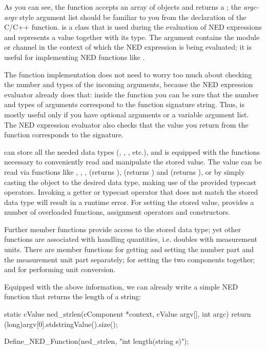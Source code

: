 As you can see, the function accepts an array of 
objects and returns a ; the \textit{argc-argv} style
argument list should be familiar to you from the declaration of the C/C++
 function.  is a class that is used during
the evaluation of NED expressions and represents a value together with its
type.  The  argument contains the module or channel in the
context of which the NED expression is being evaluated; it is useful for
implementing NED functions like .

The function implementation does not need to worry too much about checking
the number and types of the incoming arguments, because the NED expression
evaluator already does that: inside the function you can be sure that the
number and types of arguments correspond to the function signature string.
Thus,  is mostly useful only if you have optional arguments or a
variable argument list. The NED expression evaluator also checks that the
value you return from the function corresponds to the signature.

 can store all the needed data types (,
, , etc.), and is equipped with the functions
necessary to conveniently read and manipulate the stored value. The value can
be read via functions like , ,
,  (returns ),
 (returns ) and
 (returns ), or by simply casting the
object to the desired data type, making use of the provided typecast
operators. Invoking a getter or typecast operator that does not match the
stored data type will result in a runtime error. For setting the stored
value,  provides a number of overloaded 
functions, assignment operators and constructors.

Further  member functions provide access to the stored
data type; yet other functions are associated with handling quantities,
i.e. doubles with measurement units. There are member functions for getting
and setting the number part and the measurement unit part separately; for
setting the two components together; and for performing unit conversion.

Equipped with the above information, we can already write a simple NED function
that returns the length of a string:

\begin{cpp}
static cValue ned_strlen(cComponent *context, cValue argv[], int argc)
{
    return (long)argv[0].stdstringValue().size();
}

Define_NED_Function(ned_strlen, "int length(string s)");
\end{cpp}

